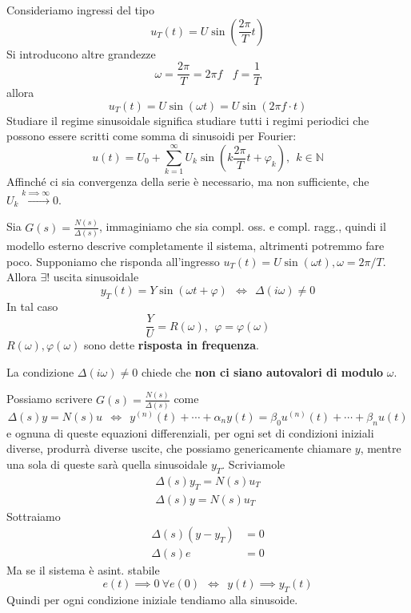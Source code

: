Consideriamo ingressi del tipo
\begin{equation*}
	u_T(t) =U\sin\left(\frac{2\pi }{T} t\right)
\end{equation*}
Si introducono altre grandezze
\begin{equation*}
	\omega =\frac{2\pi }{T} =2\pi f\ \ \ \ f=\frac{1}{T}
\end{equation*}
allora
\begin{equation*}
	u_T(t) =U\sin(\omega t) =U\sin(2\pi f\cdotp t)
\end{equation*}
Studiare il regime sinusoidale significa studiare tutti i regimi periodici che possono essere scritti come somma di sinusoidi per Fourier:
\begin{equation*}
	u(t) =U_0 +\sum\limits ^{\infty }_{k=1} U_k\sin\left(k\frac{2\pi }{T} t+\varphi _k\right) ,\ \ k\in \mathbb{N}
\end{equation*}
Affinché ci sia convergenza della serie è necessario, ma non sufficiente, che $U_k\xrightarrow{k\implies \infty } 0$.
\begin{thm}
	Sia $G(s) =\frac{N(s)}{\Delta (s)}$, immaginiamo che sia compl. oss. e compl. ragg., quindi il modello esterno descrive completamente il sistema, altrimenti potremmo fare poco. Supponiamo che risponda all'ingresso $u_T(t) =U\sin(\omega t) ,\omega =2\pi /T$. Allora $\exists !$ uscita sinusoidale
	\begin{equation*}
		y_T(t) =Y\sin(\omega t+\varphi) \ \ \iff \ \ \Delta (i\omega) \neq 0
	\end{equation*}
	In tal caso
	\begin{equation*}
		\frac{Y}{U} =R(\omega) ,\ \ \varphi =\varphi (\omega)
	\end{equation*}
	$R(\omega) ,\varphi (\omega)$ sono dette \textbf{risposta in frequenza}.
\end{thm}
La condizione $\Delta (i\omega) \neq 0$ chiede che \textbf{non ci siano autovalori di modulo} $\omega $.

Possiamo scrivere $G(s) =\frac{N(s)}{\Delta (s)}$ come
\begin{equation*}
	\Delta (s) y=N(s) u\ \ \iff \ \ y^{(n)}(t) +\cdots +\alpha _n y(t) =\beta _0 u^{(n)}(t) +\cdots +\beta _n u(t)
\end{equation*}
e ognuna di queste equazioni differenziali, per ogni set di condizioni iniziali diverse, produrrà diverse uscite, che possiamo genericamente chiamare $y$, mentre una sola di queste sarà quella sinusoidale $y_T$. Scriviamole
\begin{gather*}
	\Delta (s) y_T =N(s) u_T\\
	\Delta (s) y=N(s) u_T
\end{gather*}
Sottraiamo
\begin{equation*}
	\begin{aligned}
		\Delta (s)(y-y_T) & =0 \\
		\Delta (s) e      & =0 
	\end{aligned}
\end{equation*}
Ma se il sistema è asint. stabile
\begin{equation*}
	e(t)\implies 0\ \forall e(0) \ \ \iff \ \ y(t)\implies y_T(t)
\end{equation*}
Quindi per ogni condizione iniziale tendiamo alla sinusoide.

